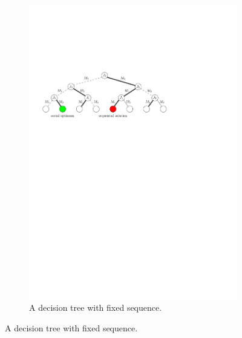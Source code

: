 \documentclass[runningheads]{llncs}
\begin{document}
\begin{figure}
	\centering
	\begin{subfigure}{.8\textwidth}
		\centering
		\includegraphics[scale=.8]{decision_tree_fixed}
		\caption{A decision tree with fixed sequence.}
		\label{fig:decision_tree_fixed}
	\end{subfigure}%
	

\end{figure}
\end{document}

